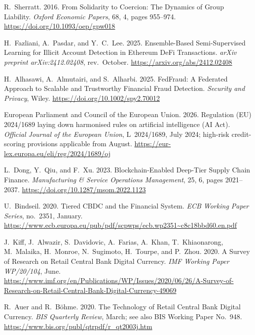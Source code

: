\documentclass[12pt,a4paper]{report}
\begin{document}
{\begin{enumerate}[label={[\arabic*]}]
\item R.~Sherratt. 2016. From Solidarity to Coercion: The Dynamics of Group Liability. \emph{Oxford Economic Papers}, 68, 4, pages 955--974. \url{https://doi.org/10.1093/oep/gpw018}


\item H.~Fazliani, A.~Pasdar, and Y.~C.~Lee. 2025. Ensemble-Based Semi-Supervised Learning for Illicit Account Detection in Ethereum DeFi Transactions. \emph{arXiv preprint arXiv:2412.02408}, rev.~October. \url{https://arxiv.org/abs/2412.02408}


\item H.~Alhasawi, A.~Almutairi, and S.~Alharbi. 2025. FedFraud: A Federated Approach to Scalable and Trustworthy Financial Fraud Detection. \emph{Security and Privacy}, Wiley. \url{https://doi.org/10.1002/spy2.70012}


\item European Parliament and Council of the European Union. 2026. Regulation (EU) 2024/1689 laying down harmonised rules on artificial intelligence (AI Act). \emph{Official Journal of the European Union}, L~2024/1689, July 2024; high-risk credit-scoring provisions applicable from August. \url{https://eur-lex.europa.eu/eli/reg/2024/1689/oj}


\item L.~Dong, Y.~Qiu, and F.~Xu. 2023. Blockchain-Enabled Deep-Tier Supply Chain Finance. \emph{Manufacturing \& Service Operations Management}, 25, 6, pages 2021--2037. \url{https://doi.org/10.1287/msom.2022.1123}


\item U.~Bindseil. 2020. Tiered CBDC and the Financial System. \emph{ECB Working Paper Series}, no.~2351, January. \url{https://www.ecb.europa.eu/pub/pdf/scpwps/ecb.wp2351~c8c18bbd60.en.pdf}


\item J.~Kiff, J.~Alwazir, S.~Davidovic, A.~Farias, A.~Khan, T.~Khiaonarong, M.~Malaika, H.~Monroe, N.~Sugimoto, H.~Tourpe, and P.~Zhou. 2020. A Survey of Research on Retail Central Bank Digital Currency. \emph{IMF Working Paper WP/20/104}, June. \url{https://www.imf.org/en/Publications/WP/Issues/2020/06/26/A-Survey-of-Research-on-Retail-Central-Bank-Digital-Currency-49069}


\item R.~Auer and R.~B\"{o}hme. 2020. The Technology of Retail Central Bank Digital Currency. \emph{BIS Quarterly Review}, March; see also BIS Working Paper No.~948. \url{https://www.bis.org/publ/qtrpdf/r_qt2003j.htm}



\end{enumerate}}
\end{document}
